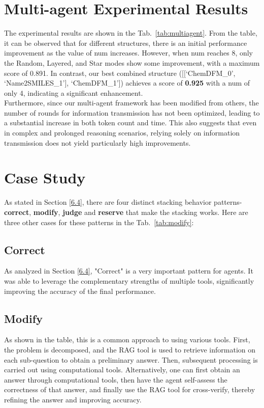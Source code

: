 \section{Multi-agent Experimental Results}
\label{multi-agent results}
The experimental results are shown in the Tab.~\ref{tab:multiagent}. From the table, it can be observed that for different structures, there is an initial performance improvement as the value of num increases. However, when num reaches 8, only the Random, Layered, and Star modes show some improvement, with a maximum score of 0.891. In contrast, our best combined structure ([[‘ChemDFM\_0’, ‘Name2SMILES\_1’], ‘ChemDFM\_1’]) achieves a score of \textbf{0.925} with a num of only 4, indicating a significant enhancement.\\
Furthermore, since our multi-agent framework has been modified from others, the number of rounds for information transmission has not been optimized, leading to a substantial increase in both token count and time. This also suggests that even in complex and prolonged reasoning scenarios, relying solely on information transmission does not yield particularly high improvements. 

\label{appendix mulagent results}


\section{Case Study}
\label{casestudy}
As stated in Section \ref{6.4}, there are four distinct stacking behavior patterns-\textbf{correct}, \textbf{modify}, \textbf{judge} and \textbf{reserve} that make the stacking works. Here are three other cases for these patterns in the Tab.~\ref{tab:modify}:
\subsection{Correct}
As analyzed in Section \ref{6.4}, "Correct" is a very important pattern for agents. It was able to leverage the complementary strengths of multiple tools, significantly improving the accuracy of the final performance. 
\subsection{Modify}
As shown in the table, this is a common approach to using various tools. First, the problem is decomposed, and the RAG tool is used to retrieve information on each sub-question to obtain a preliminary answer. Then, subsequent processing is carried out using computational tools. Alternatively, one can first obtain an answer through computational tools, then have the agent self-assess the correctness of that answer, and finally use the RAG tool for cross-verify, thereby refining the answer and improving accuracy.

